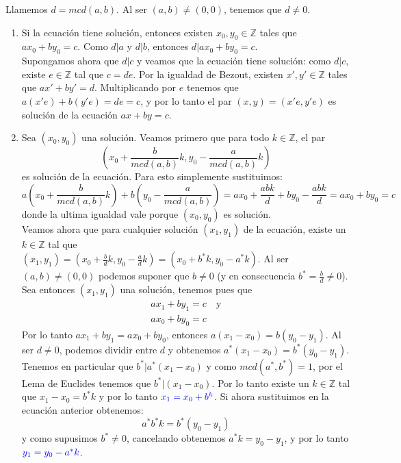 \documentclass{report}
\begin{document}
\begin{myproof}
	Llamemos $d=mcd(a,b)$. Al ser $(a,b)\neq (0,0)$, tenemos que $d\neq 0$.
	\begin{enumerate}
		\item Si la ecuación tiene solución, entonces existen $x_0,y_0\in\mathbb{Z}$ tales que $ax_0+by_0=c$. Como $d|a$ y $d|b$, entonces $d|ax_0+by_0=c$.
		      \\Supongamos ahora que $d|c$ y veamos que la ecuación tiene solución: como $d|c$, existe $e\in\mathbb{Z}$ tal que $c=de$. Por la igualdad de Bezout, existen $x',y'\in\mathbb{Z}$ tales que $ax'+by'=d$. Multiplicando por $e$ tenemos que $a(x'e)+b(y'e)=de=c$, y por lo tanto el par $(x,y)=(x'e,y'e)$ es solución de la ecuación $ax+by=c$.
		\item Sea $(x_0,y_0)$ una solución. Veamos primero que para todo $k\in\mathbb{Z}$, el par $$\left( x_0+\frac{b}{mcd(a,b)}k,y_0-\frac{a}{mcd(a,b)}k \right) $$es solución de la ecuación. Para esto simplemente sustituimos:$$a \left( x_0+\frac{b}{mcd(a,b)}k \right)+b\left( y_0-\frac{a}{mcd(a,b)} \right)=ax_0+\frac{abk}{d}+by_0-\frac{abk}{d}=ax_0+by_0=c  $$donde la ultima igualdad vale porque $(x_0,y_0)$ es solución.\\
		      Veamos ahora que para cualquier solución $(x_1,y_1)$ de la ecuación, existe un $k\in\mathbb{Z}$ tal que\\ $(x_1,y_1)=\left( x_0+\frac{b}{d}k,y_0-\frac{a}{d}k\right)=(x_0+b^*k,y_0-a^*k)$. Al ser $(a,b)\neq(0,0)$ podemos suponer que $b\neq 0$ (y en consecuencia $b^*=\frac{b}{d}\neq0$).\\
		      Sea entonces $(x_1,y_1)$ una solución, tenemos pues que $$\begin{aligned} ax_{1} +by_{1} =c & \ \text{y}\\ ax_{0} +by_{0} =c &  \end{aligned}$$Por lo tanto $ax_1+by_1=ax_0+by_0$, entonces $a(x_1-x_0)=b(y_0-y_1)$. Al ser $d\neq0$, podemos dividir entre $d$ y obtenemos $a^*(x_1-x_0)=b^*(y_0-y_1)$.\\
		      Tenemos en particular que $b^*|a^*(x_1-x_0)$ y como $mcd(a^*,b^*)=1$, por el Lema de Euclides tenemos que $b^*|(x_1-x_0)$. Por lo tanto existe un $k\in\mathbb{Z}$ tal que $x_1-x_0=b^*k$ y por lo tanto $\textcolor{blue}{x_1=x_0+b^k}$. Si ahora sustituimos en la ecuación anterior obtenemos:$$a^*b^*k=b^*(y_0-y_1)$$y como supusimos $b^*\neq0$, cancelando obtenemos $a^*k=y_0-y_1$, y por lo tanto $\textcolor{blue}{y_1=y_0-a^*k}$.
	\end{enumerate}
\end{myproof}\newpage{}
\end{document}

